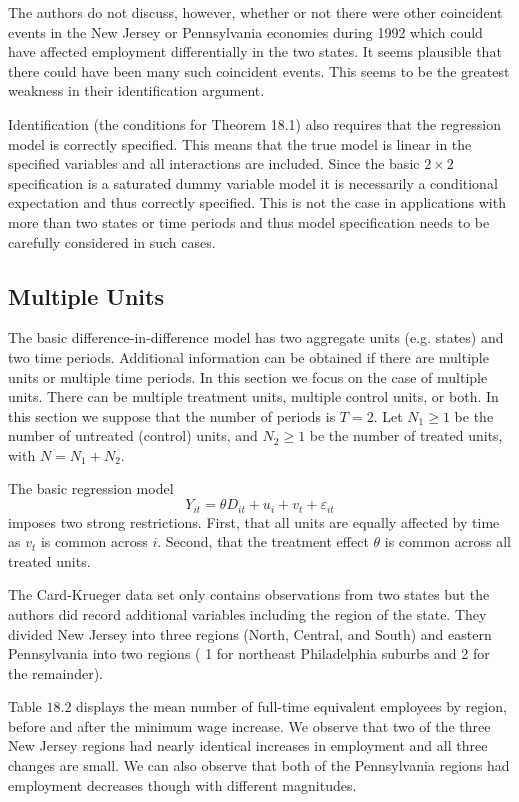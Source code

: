 \documentclass[10pt]{article}
\begin{document}
The authors do not discuss, however, whether or not there were other coincident events in the New Jersey or Pennsylvania economies during 1992 which could have affected employment differentially in the two states. It seems plausible that there could have been many such coincident events. This seems to be the greatest weakness in their identification argument.

Identification (the conditions for Theorem 18.1) also requires that the regression model is correctly specified. This means that the true model is linear in the specified variables and all interactions are included. Since the basic $2 \times 2$ specification is a saturated dummy variable model it is necessarily a conditional expectation and thus correctly specified. This is not the case in applications with more than two states or time periods and thus model specification needs to be carefully considered in such cases.

\subsection{Multiple Units}
The basic difference-in-difference model has two aggregate units (e.g. states) and two time periods. Additional information can be obtained if there are multiple units or multiple time periods. In this section we focus on the case of multiple units. There can be multiple treatment units, multiple control units, or both. In this section we suppose that the number of periods is $T=2$. Let $N_{1} \geq 1$ be the number of untreated (control) units, and $N_{2} \geq 1$ be the number of treated units, with $N=N_{1}+N_{2}$.

The basic regression model
$$
Y_{i t}=\theta D_{i t}+u_{i}+v_{t}+\varepsilon_{i t}
$$
imposes two strong restrictions. First, that all units are equally affected by time as $v_{t}$ is common across $i$. Second, that the treatment effect $\theta$ is common across all treated units.

The Card-Krueger data set only contains observations from two states but the authors did record additional variables including the region of the state. They divided New Jersey into three regions (North, Central, and South) and eastern Pennsylvania into two regions ( 1 for northeast Philadelphia suburbs and 2 for the remainder).

Table $18.2$ displays the mean number of full-time equivalent employees by region, before and after the minimum wage increase. We observe that two of the three New Jersey regions had nearly identical increases in employment and all three changes are small. We can also observe that both of the Pennsylvania regions had employment decreases though with different magnitudes.
\end{document}
